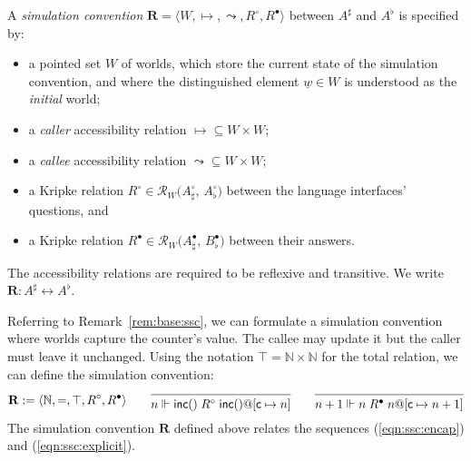 \documentclass[acmsmall,screen,review,anonymous]{acmart}
\newcommand{\kw}[1]{\ensuremath{ \mathsf{#1} }}
\newcommand{\que}{\circ}
\newcommand{\ans}{\bullet}
\newcommand{\intl}[1]{\underline{#1}}
\begin{document}
\begin{definition} \label{def:sconv} %
A \emph{simulation convention}
$\mathbf{R} = \langle W, {\mapsto}, {\leadsto}, R^\que, R^\ans \rangle$
between %
$A^\sharp$ and $A^\flat$
is specified by:
\begin{itemize}
  \item a pointed set $W$ of worlds,
    which store the current state of the simulation convention,
    and where the distinguished element $\intl{w} \in W$ is understood as the \emph{initial} world;
  \item a \emph{caller} accessibility relation ${\mapsto} \subseteq W \times W$;
  \item a \emph{callee} accessibility relation ${\leadsto} \subseteq W \times W$;
  \item a Kripke relation $R^\que \in \mathcal{R}_W\big(A_\sharp^\que,\, A_\flat^\que\big)$
    between the language interfaces' questions, and
  \item a Kripke relation $R^\ans \in \mathcal{R}_W\big(A_\sharp^\ans,\, B_\flat^\ans\big)$
    between their answers.
\end{itemize}
The accessibility relations are required to be reflexive and transitive.
We write $\mathbf{R} : A^\sharp \leftrightarrow A^\flat$.
\end{definition}

\begin{example} \label{ex:base:ssc} %
Referring to Remark~\ref{rem:base:ssc},
we can formulate a simulation convention
where worlds capture the counter's value.
The callee may update it
but the caller must leave it unchanged.
Using the notation $\top = \mathbb{N} \times \mathbb{N}$
for the total relation,
we can define the simulation convention:
\[
  \mathbf{R} := \langle \mathbb{N}, {=}, \top, R^\que, R^\ans \rangle
  \qquad
  \begin{prooftree}
    \infer0{n \Vdash \kw{inc}() \mathrel{R^\que} \kw{inc}()@[\kw{c} \mapsto n]}
  \end{prooftree}
  \qquad
  \begin{prooftree}
    \infer0{n + 1 \Vdash n \mathrel{R^\ans} n@[\kw{c} \mapsto n + 1]}
  \end{prooftree}
\]
The simulation convention $\mathbf{R}$ defined above
relates the sequences (\ref{eqn:ssc:encap}) and (\ref{eqn:ssc:explicit}).
\end{example}
\end{document}
